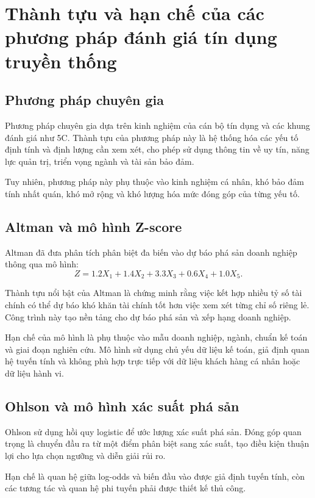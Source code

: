 \section{Thành tựu và hạn chế của các phương pháp đánh giá tín dụng truyền thống}

\subsection{Phương pháp chuyên gia}

Phương pháp chuyên gia dựa trên kinh nghiệm của cán bộ tín dụng và các khung đánh giá như 5C. Thành tựu của phương pháp này là hệ thống hóa các yếu tố định tính và định lượng cần xem xét, cho phép sử dụng thông tin về uy tín, năng lực quản trị, triển vọng ngành và tài sản bảo đảm.

Tuy nhiên, phương pháp này phụ thuộc vào kinh nghiệm cá nhân, khó bảo đảm tính nhất quán, khó mở rộng và khó lượng hóa mức đóng góp của từng yếu tố.

\subsection{Altman và mô hình Z-score}

Altman \cite{altman1968financial} đã đưa phân tích phân biệt đa biến vào dự báo phá sản doanh nghiệp thông qua mô hình:
\[
Z = 1.2X_1 + 1.4X_2 + 3.3X_3 + 0.6X_4 + 1.0X_5.
\]

Thành tựu nổi bật của Altman là chứng minh rằng việc kết hợp nhiều tỷ số tài chính có thể dự báo khó khăn tài chính tốt hơn việc xem xét từng chỉ số riêng lẻ. Công trình này tạo nền tảng cho dự báo phá sản và xếp hạng doanh nghiệp.

Hạn chế của mô hình là phụ thuộc vào mẫu doanh nghiệp, ngành, chuẩn kế toán và giai đoạn nghiên cứu. Mô hình sử dụng chủ yếu dữ liệu kế toán, giả định quan hệ tuyến tính và không phù hợp trực tiếp với dữ liệu khách hàng cá nhân hoặc dữ liệu hành vi.

\subsection{Ohlson và mô hình xác suất phá sản}

Ohlson \cite{ohlson1980financial} sử dụng hồi quy logistic để ước lượng xác suất phá sản. Đóng góp quan trọng là chuyển đầu ra từ một điểm phân biệt sang xác suất, tạo điều kiện thuận lợi cho lựa chọn ngưỡng và diễn giải rủi ro.

Hạn chế là quan hệ giữa log-odds và biến đầu vào được giả định tuyến tính, còn các tương tác và quan hệ phi tuyến phải được thiết kế thủ công.

